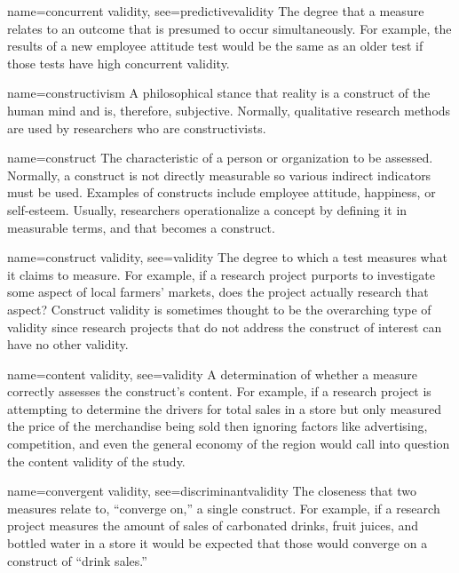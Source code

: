 {name={concurrent validity},
	see={predictivevalidity}}
{%
	The degree that a measure relates to an outcome that is presumed to occur simultaneously. For example, the results of a new employee attitude test would be the same as an older test if those tests have high concurrent validity.
}

{name={constructivism}}
{%
	A philosophical stance that reality is a construct of the human mind and is, therefore, subjective. Normally, qualitative research methods are used by researchers who are constructivists.
}

{name={construct}}
{%
	The characteristic of a person or organization to be assessed. Normally, a construct is not directly measurable so various indirect indicators must be used. Examples of constructs include employee attitude, happiness, or self-esteem. Usually, researchers operationalize a concept by defining it in measurable terms, and that becomes a construct.
}

{name={construct validity},
	see={validity}}
{%
	The degree to which a test measures what it claims to measure. For example, if a research project purports to investigate some aspect of local farmers' markets, does the project actually research that aspect? Construct validity is sometimes thought to be the overarching type of validity since research projects that do not address the construct of interest can have no other validity.
}

{name={content validity},
	see={validity}}
{%
	A determination of whether a measure correctly assesses the construct's content. For example, if a research project is attempting to determine the drivers for total sales in a store but only measured the price of the merchandise being sold then ignoring factors like advertising, competition, and even the general economy of the region would call into question the content validity of the study.
}


{name={convergent validity},
	see={discriminantvalidity}}
{%
	The closeness that two measures relate to, ``converge on,'' a single construct. For example, if a research project measures the amount of sales of carbonated drinks, fruit juices, and bottled water in a store it would be expected that those would converge on a construct of ``drink sales.''
}

